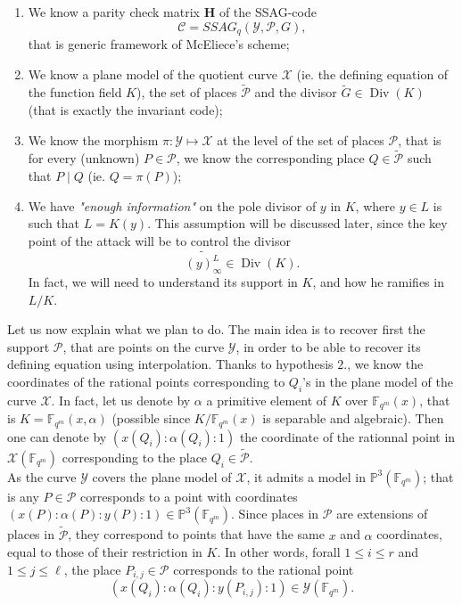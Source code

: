 \documentclass[10pt]{article}
\newcommand{\s}{\vspace{0.3cm}}
\newcommand{\PP}{\mathbb{P}}
\newcommand{\fqm}{\mathbb{F}_{q^m}}
\newcommand{\X}{\mathcal{X}}
\newcommand{\Y}{\mathcal{Y}}
\newcommand{\PR}{\mathcal{P}}
\newcommand{\Div}{\operatorname{Div}}
\newcommand{\hugues}[1]{\textcolor{blue}{#1}}
\newcommand{\notehugues}[1]{\marginpar{\small\hugues{#1}}}
\begin{document}
\begin{enumerate}
\item We know a parity check matrix $\mathbf{H}$ of the SSAG-code  \[\mathcal{C} = SSAG_q(\Y,\PR,G),\]
that is generic framework of McEliece's scheme;\notehugues{reformuler}
\item We know a plane model of the quotient curve $\X$ (ie. the defining equation of the function field $K$), the set of places $\tilde{\PR}$ and the divisor $\tilde{G} \in \Div(K)$ (that is exactly the invariant code);
\item We know the morphism $\pi : \Y \longmapsto \X$ at the level of the set of places $\PR$, that is for every (unknown) $P \in \PR$, we know the corresponding place $Q \in \tilde{\PR}$ such that $P \mid Q$ (ie. $Q=\pi(P)$);
\item We have \emph{"enough information"} on the pole divisor of $y$ in $K$, where $y \in L$ is such that $L=K(y)$. This assumption will be discussed later, since the key point of the attack will be to control the divisor 
\[\widetilde{(y)^L_{\infty}} \in \Div(K).\] 
In fact, we will need to understand its support in $K$, and how he ramifies in $L/K$.
\end{enumerate}
\s

Let us now explain what we plan to do. The main idea is to recover first the support $\PR$, that are points on the curve $\Y$, in order to be able to recover its defining equation using interpolation. Thanks to hypothesis $2.$, we know the coordinates of the rational points corresponding to $Q_i$'s in the plane model of the curve $\X$. In fact, let us denote by $\alpha$ a primitive element of $K$ over $\fqm(x)$, that is $K = \fqm(x,\alpha)$ (possible since $K/\fqm(x)$ is separable and algebraic). Then one can denote by $(x(Q_i):\alpha(Q_i):1)$ the coordinate of the rationnal point in $\X(\fqm)$ corresponding to the place $Q_i \in \tilde{\PR}$. \\

As the curve $\Y$ covers the plane model of $\X$, it admits a model in $\PP^3(\fqm)$; that is any $P \in \PR$ corresponds to a point with coordinates $(x(P):\alpha(P):y(P):1) \in \PP^3(\fqm)$. Since places in $\PR$ are extensions of places in $\tilde{\PR}$, they correspond to points that have the same $x$ and $\alpha$ coordinates, equal to those of their restriction in $K$. In other words, forall $1 \leq i \leq r$ and $1 \leq j \leq \ell$, the place $P_{i,j} \in \PR$ corresponds to the rational point
\[ (x(Q_i):\alpha(Q_i):y(P_{i,j}):1) \in \Y(\fqm).\]
\end{document}
